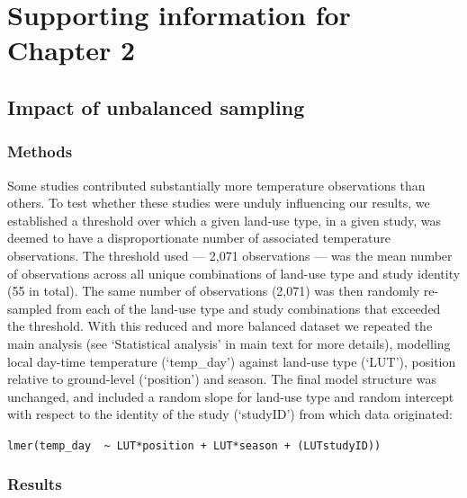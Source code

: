 \documentclass[12pt,a4paper,]{report}
\theoremstyle{definition}
\theoremstyle{definition}
\theoremstyle{definition}
\theoremstyle{remark}
\begin{document}
\pagebreak

\clearpage
\appendix
{} \addappheadtotoc
\setcounter{figure}{0} \makeatletter 
\renewcommand{\thefigure}{A1.\@arabic\c@figure} \makeatother

\chapter{Supporting information for Chapter
2}\label{supporting-information-for-chapter-2}

\section{Impact of unbalanced sampling}\label{text-A-1-1}

\subsection{Methods}\label{methods-1}

Some studies contributed substantially more temperature observations
than others. To test whether these studies were unduly influencing our
results, we established a threshold over which a given land-use type, in
a given study, was deemed to have a disproportionate number of
associated temperature observations. The threshold used --- 2,071
observations --- was the mean number of observations across all unique
combinations of land-use type and study identity (55 in total). The same
number of observations (2,071) was then randomly re-sampled from each of
the land-use type and study combinations that exceeded the threshold.
With this reduced and more balanced dataset we repeated the main
analysis (see `Statistical analysis' in main text for more details),
modelling local day-time temperature (`temp\_day') against land-use type
(`LUT'), position relative to ground-level (`position') and season. The
final model structure was unchanged, and included a random slope for
land-use type and random intercept with respect to the identity of the
study (`studyID') from which data originated:

\texttt{lmer(temp\_day\ \ \textasciitilde{}\ LUT*position\ +\ LUT*season\ +\ (LUT\textbar{}studyID))}

\subsection{Results}\label{results-2}
\end{document}
